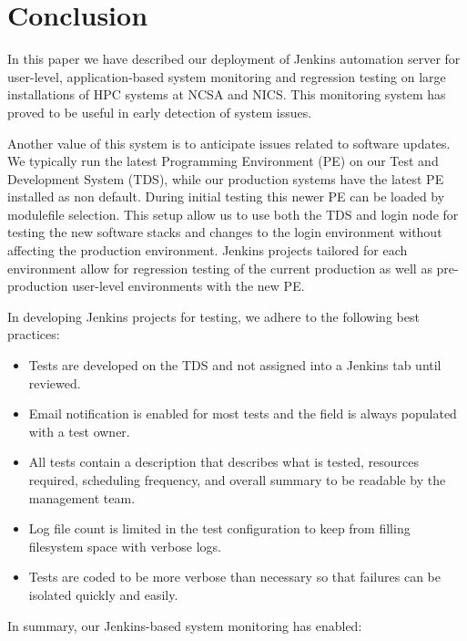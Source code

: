 \documentclass[AMA]{WileyNJD-v1}
\begin{document}
\section{Conclusion}
\label{sec:Conclusion}

In this paper we have described our deployment of Jenkins automation server for user-level, application-based system monitoring and regression testing on large installations of HPC systems at NCSA and NICS. 
This monitoring system has proved to be useful in early detection of system issues. 

Another value of this system is to anticipate issues related to software updates. 
We typically run the latest Programming Environment (PE) on our Test and Development System (TDS), while our production systems have the latest PE installed as non default. 
During initial testing this newer PE can be loaded by modulefile selection. This setup allow us to use both the TDS and login node for testing the new software stacks and changes to the login environment without affecting the production environment. 
Jenkins projects tailored for each environment allow for regression testing of the current production as well as pre-production user-level environments with the new PE.

In developing Jenkins projects for testing, we adhere to the following best practices: 
\begin{itemize}
\item Tests are developed on the TDS and not assigned into a Jenkins tab until reviewed. 
\item Email notification is enabled for most tests and the field is always populated with a test owner.
\item All tests contain a description that describes what is tested, resources required, scheduling frequency, and overall summary  to be readable by the management team.
\item Log file count is limited in the test configuration to keep from filling filesystem space with verbose logs.
\item Tests are coded to be more verbose than necessary so that failures can be isolated quickly and easily.
\end{itemize}

In summary, our Jenkins-based system monitoring has enabled: 
\end{document}
